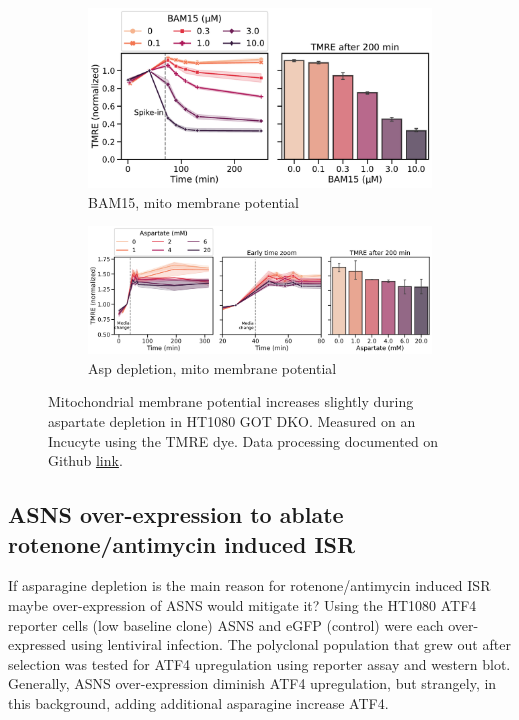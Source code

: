 \begin{figure}[!ht]
     \centering
     \begin{subfigure}[b]{0.6\textwidth}
         \includegraphics[width=\textwidth]{figures/sapp/ISR/HT1080_GOT_DKO_TMRA_BAM15tit.pdf}
         \caption{BAM15, mito membrane potential}
         \label{fig:sapp:ISR:HT1080_GOT_DKO_TMRA_BAM15tit}
     \end{subfigure}
     \hfill
     \begin{subfigure}[b]{0.85\textwidth}
         \includegraphics[width=\textwidth]{figures/sapp/ISR/HT1080_GOT_DKO_TMRA_ASPtit.pdf}
         \caption{Asp depletion, mito membrane potential}
         \label{fig:sapp:ISR:HT1080_GOT_DKO_TMRA_ASPtit}
     \end{subfigure}
     \hfill
        \caption[Mito membrane potential in GOT DKO.]{
        Mitochondrial membrane potential increases slightly during aspartate depletion in HT1080 GOT DKO.
        Measured on an Incucyte using the TMRE dye.
        Data processing documented on Github \href{https://github.com/krdav/IncuCyte_TMRE-assay}{link}.
        }
        \label{fig:sapp:ISR:HT1080_GOT_DKO_TMRE}
\end{figure}






\FloatBarrier
\subsection{ASNS over-expression to ablate rotenone/antimycin induced ISR}
If asparagine depletion is the main reason for rotenone/antimycin induced ISR maybe over-expression of ASNS would mitigate it?
Using the HT1080 ATF4 reporter cells (low baseline clone) ASNS and eGFP (control) were each over-expressed using lentiviral infection.
The polyclonal population that grew out after selection was tested for ATF4 upregulation using reporter assay and western blot.
Generally, ASNS over-expression diminish ATF4 upregulation, but strangely, in this background, adding additional asparagine increase ATF4.

